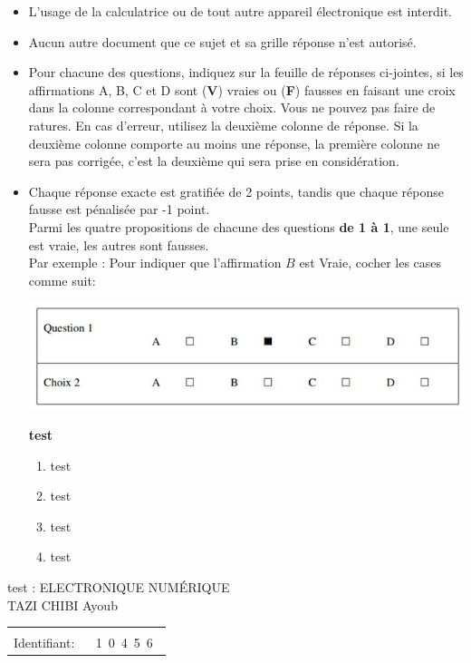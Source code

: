 \documentclass{book}%
\begin{document}
\begin{itemize}%
\item%
L'usage de la calculatrice ou de tout autre appareil électronique est interdit.%
\item%
Aucun autre document que ce sujet et sa grille réponse n'est autorisé.%
\item%
Pour chacune des questions, indiquez sur la feuille de réponses ci-jointes, si les affirmations A, B, C et D sont (\textbf{V}) vraies ou (\textbf{F}) fausses en faisant une croix dans la colonne correspondant à votre choix. Vous ne pouvez pas faire de ratures. En cas d'erreur, utilisez la deuxième colonne de réponse. Si la deuxième colonne comporte au moins une réponse, la première colonne ne sera pas corrigée, c'est la deuxième qui sera prise en considération.%
\item%
Chaque réponse exacte est gratifiée de 2 points, tandis que chaque réponse fausse est pénalisée par -1 point. \\ 	Parmi les quatre propositions de chacune des questions \textbf{de 1 à 1}, une seule est vraie, les autres sont fausses. \\ 	Par exemple : Pour indiquer que l'affirmation $B$ est Vraie, cocher les cases comme suit:  \\ \begin{center}	\includegraphics[scale=0.8]{reponses.png} \end{center}%
\thispagestyle{empty}%
\begin{exercise}%
\textbf{test }%
\begin{enumerate}[label=\textbf{\Alph*. }]%
\item%
test%
\item%
test%
\item%
test%
\item%
test%
\end{enumerate}%
\end{exercise}%
\end{itemize}%
\newpage%
\thispagestyle{empty}%
test : ELECTRONIQUE NUMÉRIQUE $\qquad \qquad \qquad \qquad \qquad \qquad \qquad \qquad$ TAZI CHIBI Ayoub%
\begin{flushright}%
\begin{tabular}{|l|}%
\hline%
 \\%
\thispagestyle{empty}%
Identifiant: $\quad$ {\Large 1~0~4~5~6~}%
 \\%
\hline%
\end{tabular}%
\end{flushright}%
\end{document}

